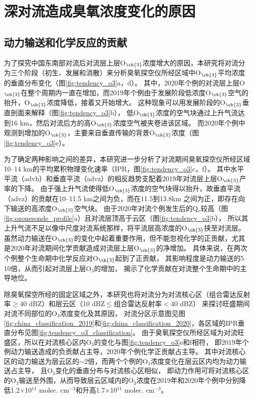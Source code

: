 \section{深对流造成臭氧浓度变化的原因} \label{sec:convec_impacts}

\subsection{动力输送和化学反应的贡献}

为了探究中国东南部对流后对流层上层O$_{\ch{3}}$浓度增大的原因，本研究将对流分为三个阶段（初生、发展和消散）来分析臭氧探空仪所经区域中O$_{\ch{3}}$平均浓度的垂直分布变化（图\ref{fig:tendency_o3}a，d）。
其中，2020年个例的对流层上层O$_{\ch{3}}$在整个周期内一直在增加，而2019年个例由于发展阶段低浓度O$_{\ch{3}}$空气的抬升，O$_{\ch{3}}$浓度降低，接着又开始增大。
这种现象可以用发展阶段的O$_{\ch{3}}$垂直剖面来解释（图\ref{fig:tendency_o3}b），
低O$_{\ch{3}}$浓度的空气块通过上升气流达到16 km，然后对流后方的高O$_{\ch{3}}$浓度空气被夹卷进该区域。
而2020年个例中观测到增加的O$_{\ch{3}}$，主要来自垂直传输的背景O$_{\ch{3}}$浓度（图\ref{fig:tendency_o3}e）。

为了确定两种影响之间的差异，本研究进一步分析了对流期间臭氧探空仪所经区域10--14 km的平均累积物理变化速率（IPR，图\ref{fig:tendency_o3}c，f）。
其中水平平流（advh）和垂直平流（advz）的相反趋势支配着2019年对流层上层O$_{\ch{3}}$产率的下降。
由于强上升气流使得低O$_{\ch{3}}$浓度的空气块得以抬升，故垂直平流（advz）的贡献在10--11.5 km之间为负，而在11.5到13.8km 之间为正，即存在向下输送的高浓度O$_{\ch{3}}$空气块。
由于2020年对流个例发生后的Q$_v$较高（图\ref{fig:ozonesonde_profile}a）且对流层顶高于云区（图\ref{fig:tendency_o3}b），
所以其上升气流不足以像中尺度对流系统那样，将平流层高浓度的O$_{\ch{3}}$挟至对流层\citep{Phoenix.2020}。
虽然动力输送在O$_{\ch{3}}$的变化中起着重要作用，但不能忽视化学的正贡献，尤其是2020年对流期间化学贡献造成对流层上层O$_{\ch{3}}$的净增加。
具体来说，在两次个例整个生命期中化学反应对O$_{\ch{3}}$起到了正贡献，
其影响程度是动力输送的5--10倍，从而引起对流层上层O$_3$的增加，
揭示了化学贡献在对流整个生命期中的主导地位。

除臭氧探空所经的固定区域之外，本研究也将对流分为对流核心区（组合雷达反射率$\geq$40 dBZ）和层云区（10 dBZ$\leq$组合雷达反射率$<$40 dBZ）
来探讨旺盛期间对流不同部位的O$_3$浓度变化及其原因，
对流分区示意图见图\ref{fig:china_classification_2019}和\ref{fig:china_classification_2020}，各区域的IPR垂直分布见图\ref{fig:tendency_o3_classification}。
由于臭氧探空仪所经区域为对流旺盛区，所以在对流核心区内O$_3$的变化与图\ref{fig:tendency_o3}e和f相符，
即2019年个例动力输送造成的负贡献占主导，2020年个例化学正贡献占主导。
其中对流核心区的动力输送为层云区的$\sim$2倍，而两个个例的O$_3$浓度变化在层云区内均为动力输送占主导，
且O$_3$变化的垂直分布与对流核心区相似，
即动力作用可将对流核心区的O$_3$输送至外围，从而导致层云区域内的O$_3$浓度在2019年和2020年个例中分别降低1.2$\times$10$^{11}$ molec. cm$^{-3}$和升高1.7$\times$10$^{11}$ molec. cm$^{-3}$。


